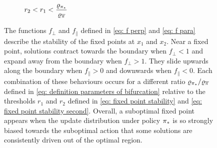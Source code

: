 \begin{figure}[hp!]
\begin{subfigure}[b]{0.33\textwidth}

        \caption{$r_2 < r_1 < \dfrac{\varrho_{{\pi}_*}}{\varrho_{\overline{\pi}}}$}
    \end{subfigure}%
    \caption{The functions $f_\perp$ and $f_\parallel$
    defined in \eqref{eq: f perp} and \eqref{eq: f para}
    describe the stability of the fixed points at $x_1$ and $x_2$.
    Near a fixed point, solutions contract towards the boundary when $f_\perp < 1$ and expand away from the boundary when $f_\perp > 1$.
    They slide upwards along the boundary when $f_\parallel > 0$ and downwards when $f_\parallel < 0$.
    Each combination of these behaviours occurs for a different ratio $\varrho_{{\pi}_*}/\varrho_{\overline{\pi}}$ defined in \eqref{eq: definition parameters of bifurcation} relative to the thresholds $r_1$ and $r_2$ defined in \eqref{eq: fixed point stability} and \eqref{eq: fixed point stability second}.
    Overall, a suboptimal fixed point appears when the update distribution under policy ${\pi}_*$ is so strongly biased towards the suboptimal action that some solutions are consistently driven out of the optimal region.
    }
    \label{fig: explain stability of fixed points}
\end{figure}